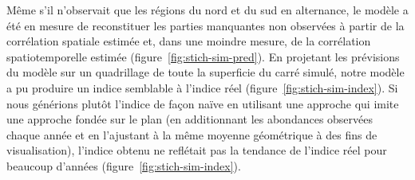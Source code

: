 \documentclass[french,11pt]{book}
\begin{document}
Même s'il n'observait que les régions du nord et du sud en alternance, le modèle a été en mesure de reconstituer les parties manquantes non observées à partir de la corrélation spatiale estimée et, dans une moindre mesure, de la corrélation spatiotemporelle estimée (figure~\ref{fig:stich-sim-pred}). En projetant les prévisions du modèle sur un quadrillage de toute la superficie du carré simulé, notre modèle a pu produire un indice semblable à l'indice réel (figure~\ref{fig:stich-sim-index}). Si nous générions plutôt l'indice de façon naïve en utilisant une approche qui imite une approche fondée sur le plan (en additionnant les abondances observées chaque année et en l'ajustant à la même moyenne géométrique à des fins de visualisation), l'indice obtenu ne reflétait pas la tendance de l'indice réel pour beaucoup d'années (figure~\ref{fig:stich-sim-index}).
\end{document}
